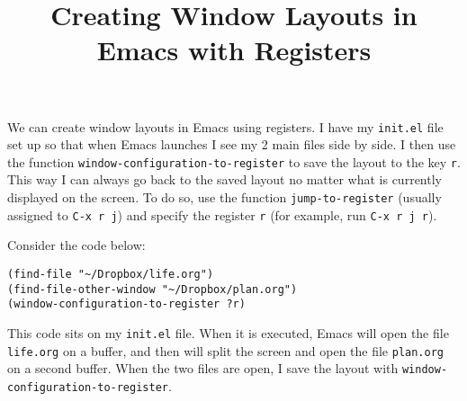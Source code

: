 \documentclass[12pt, a4paper]{article}
\date{}
\title{Creating Window Layouts in Emacs with Registers}
\begin{document}
\maketitle
We can create window layouts in Emacs using registers.
I have my \texttt{init.el} file set up so that when Emacs launches I see my 2 main files side by side. I then use the function \texttt{window-configuration-to-register} to save the layout to the key \texttt{r}. This way I can always go back to the saved layout no matter what is currently displayed on the screen. To do so, use the function \texttt{jump-to-register} (usually assigned to \texttt{C-x r j}) and specify the register \texttt{r} (for example, run \texttt{C-x r j r}).

Consider the code below:
\lstset{language=elisp,label= ,caption= ,captionpos=b,numbers=none}
\begin{lstlisting}
(find-file "~/Dropbox/life.org")
(find-file-other-window "~/Dropbox/plan.org")
(window-configuration-to-register ?r)
\end{lstlisting}
This code sits on my \texttt{init.el} file. When it is executed, Emacs will open the file \texttt{life.org} on a buffer, and then will split the screen and open the file \texttt{plan.org} on a second buffer. When the two files are open, I save the layout with \texttt{window-configuration-to-register}.
\end{document}

